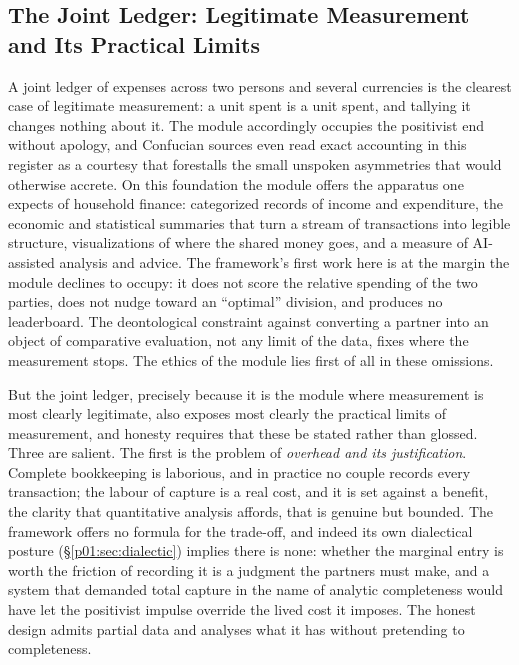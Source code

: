 \subsection{The Joint Ledger: Legitimate Measurement and Its Practical Limits}\label{p01:sec:ledger}

A joint ledger of expenses across two persons and several currencies is the clearest case of legitimate measurement: a unit spent is a unit spent, and tallying it changes nothing about it. The module accordingly occupies the positivist end without apology, and Confucian sources even read exact accounting in this register as a courtesy that forestalls the small unspoken asymmetries that would otherwise accrete. On this foundation the module offers the apparatus one expects of household finance: categorized records of income and expenditure, the economic and statistical summaries that turn a stream of transactions into legible structure, visualizations of where the shared money goes, and a measure of AI-assisted analysis and advice. The framework's first work here is at the margin the module declines to occupy: it does not score the relative spending of the two parties, does not nudge toward an ``optimal'' division, and produces no leaderboard. The deontological constraint against converting a partner into an object of comparative evaluation, not any limit of the data, fixes where the measurement stops. The ethics of the module lies first of all in these omissions.

But the joint ledger, precisely because it is the module where measurement is most clearly legitimate, also exposes most clearly the practical limits of measurement, and honesty requires that these be stated rather than glossed. Three are salient. The first is the problem of \emph{overhead and its justification}. Complete bookkeeping is laborious, and in practice no couple records every transaction; the labour of capture is a real cost, and it is set against a benefit, the clarity that quantitative analysis affords, that is genuine but bounded. The framework offers no formula for the trade-off, and indeed its own dialectical posture (§\ref{p01:sec:dialectic}) implies there is none: whether the marginal entry is worth the friction of recording it is a judgment the partners must make, and a system that demanded total capture in the name of analytic completeness would have let the positivist impulse override the lived cost it imposes. The honest design admits partial data and analyses what it has without pretending to completeness.

